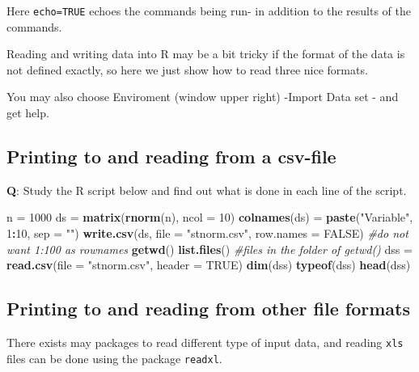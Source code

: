 \documentclass[]{article}
\newenvironment{Shaded}{\begin{snugshade}}{\end{snugshade}}
\newcommand{\KeywordTok}[1]{\textcolor[rgb]{0.13,0.29,0.53}{\textbf{#1}}}
\newcommand{\DataTypeTok}[1]{\textcolor[rgb]{0.13,0.29,0.53}{#1}}
\newcommand{\DecValTok}[1]{\textcolor[rgb]{0.00,0.00,0.81}{#1}}
\newcommand{\StringTok}[1]{\textcolor[rgb]{0.31,0.60,0.02}{#1}}
\newcommand{\CommentTok}[1]{\textcolor[rgb]{0.56,0.35,0.01}{\textit{#1}}}
\newcommand{\OtherTok}[1]{\textcolor[rgb]{0.56,0.35,0.01}{#1}}
\newcommand{\OperatorTok}[1]{\textcolor[rgb]{0.81,0.36,0.00}{\textbf{#1}}}
\newcommand{\NormalTok}[1]{#1}
\begin{document}
Here \texttt{echo=TRUE} echoes the commands being run- in addition to
the results of the commands.

Reading and writing data into R may be a bit tricky if the format of the
data is not defined exactly, so here we just show how to read three nice
formats.

You may also choose Enviroment (window upper right) -Import Data set -
and get help.

\subsection{Printing to and reading from a
csv-file}\label{printing-to-and-reading-from-a-csv-file}

\textbf{Q}: Study the R script below and find out what is done in each
line of the script.

\begin{Shaded}
\begin{Highlighting}[]
\NormalTok{n =}\StringTok{ }\DecValTok{1000}
\NormalTok{ds =}\StringTok{ }\KeywordTok{matrix}\NormalTok{(}\KeywordTok{rnorm}\NormalTok{(n), }\DataTypeTok{ncol =} \DecValTok{10}\NormalTok{)}
\KeywordTok{colnames}\NormalTok{(ds) =}\StringTok{ }\KeywordTok{paste}\NormalTok{(}\StringTok{"Variable"}\NormalTok{, }\DecValTok{1}\OperatorTok{:}\DecValTok{10}\NormalTok{, }\DataTypeTok{sep =} \StringTok{""}\NormalTok{)}
\KeywordTok{write.csv}\NormalTok{(ds, }\DataTypeTok{file =} \StringTok{"stnorm.csv"}\NormalTok{, }\DataTypeTok{row.names =} \OtherTok{FALSE}\NormalTok{)  }\CommentTok{#do not want 1:100 as rownames}
\KeywordTok{getwd}\NormalTok{()}
\KeywordTok{list.files}\NormalTok{()  }\CommentTok{#files in the folder of getwd()}
\NormalTok{dss =}\StringTok{ }\KeywordTok{read.csv}\NormalTok{(}\DataTypeTok{file =} \StringTok{"stnorm.csv"}\NormalTok{, }\DataTypeTok{header =} \OtherTok{TRUE}\NormalTok{)}
\KeywordTok{dim}\NormalTok{(dss)}
\KeywordTok{typeof}\NormalTok{(dss)}
\KeywordTok{head}\NormalTok{(dss)}
\end{Highlighting}
\end{Shaded}

\subsection{Printing to and reading from other file
formats}\label{printing-to-and-reading-from-other-file-formats}

There exists may packages to read different type of input data, and
reading \texttt{xls} files can be done using the package
\texttt{readxl}.
\end{document}
